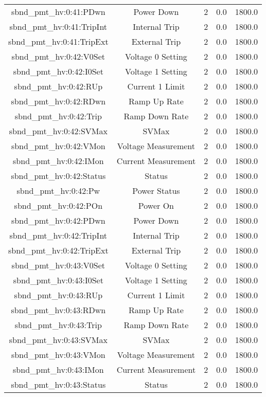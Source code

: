 \begin{table}[ptb]
\begin{tabular}{c | c c c c}
sbnd_pmt_hv:0:41:PDwn & Power Down & 2 & 0.0 & 1800.0\\ 
sbnd_pmt_hv:0:41:TripInt & Internal Trip & 2 & 0.0 & 1800.0\\ 
sbnd_pmt_hv:0:41:TripExt & External Trip & 2 & 0.0 & 1800.0\\ 
sbnd_pmt_hv:0:42:V0Set & Voltage 0 Setting & 2 & 0.0 & 1800.0\\ 
sbnd_pmt_hv:0:42:I0Set & Voltage 1 Setting & 2 & 0.0 & 1800.0\\ 
sbnd_pmt_hv:0:42:RUp & Current 1 Limit & 2 & 0.0 & 1800.0\\ 
sbnd_pmt_hv:0:42:RDwn & Ramp Up Rate & 2 & 0.0 & 1800.0\\ 
sbnd_pmt_hv:0:42:Trip & Ramp Down Rate & 2 & 0.0 & 1800.0\\ 
sbnd_pmt_hv:0:42:SVMax & SVMax & 2 & 0.0 & 1800.0\\ 
sbnd_pmt_hv:0:42:VMon & Voltage Measurement & 2 & 0.0 & 1800.0\\ 
sbnd_pmt_hv:0:42:IMon & Current Measurement & 2 & 0.0 & 1800.0\\ 
sbnd_pmt_hv:0:42:Status & Status & 2 & 0.0 & 1800.0\\ 
sbnd_pmt_hv:0:42:Pw & Power Status & 2 & 0.0 & 1800.0\\ 
sbnd_pmt_hv:0:42:POn & Power On & 2 & 0.0 & 1800.0\\ 
sbnd_pmt_hv:0:42:PDwn & Power Down & 2 & 0.0 & 1800.0\\ 
sbnd_pmt_hv:0:42:TripInt & Internal Trip & 2 & 0.0 & 1800.0\\ 
sbnd_pmt_hv:0:42:TripExt & External Trip & 2 & 0.0 & 1800.0\\ 
sbnd_pmt_hv:0:43:V0Set & Voltage 0 Setting & 2 & 0.0 & 1800.0\\ 
sbnd_pmt_hv:0:43:I0Set & Voltage 1 Setting & 2 & 0.0 & 1800.0\\ 
sbnd_pmt_hv:0:43:RUp & Current 1 Limit & 2 & 0.0 & 1800.0\\ 
sbnd_pmt_hv:0:43:RDwn & Ramp Up Rate & 2 & 0.0 & 1800.0\\ 
sbnd_pmt_hv:0:43:Trip & Ramp Down Rate & 2 & 0.0 & 1800.0\\ 
sbnd_pmt_hv:0:43:SVMax & SVMax & 2 & 0.0 & 1800.0\\ 
sbnd_pmt_hv:0:43:VMon & Voltage Measurement & 2 & 0.0 & 1800.0\\ 
sbnd_pmt_hv:0:43:IMon & Current Measurement & 2 & 0.0 & 1800.0\\ 
sbnd_pmt_hv:0:43:Status & Status & 2 & 0.0 & 1800.0\\ 

\end{tabular}
\end{table}

